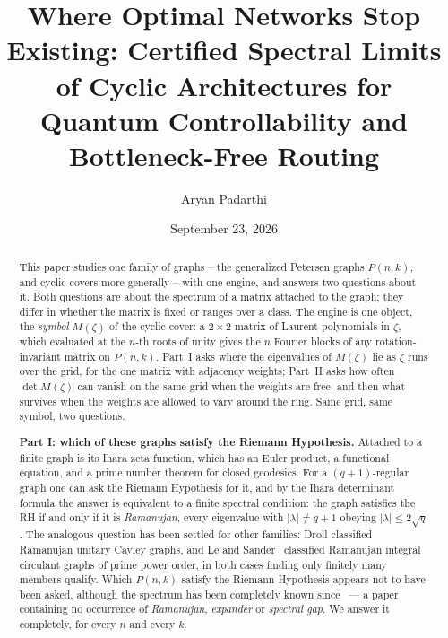 \documentclass[11pt]{article}
\title{Where Optimal Networks Stop Existing: Certified Spectral Limits\\
of Cyclic Architectures for Quantum Controllability and Bottleneck-Free Routing}
\author{Aryan Padarthi}
\date{September 23, 2026}
\theoremstyle{definition}
\begin{document}
\maketitle

\begin{abstract}
This paper studies one family of graphs -- the generalized Petersen graphs
$P(n,k)$, and cyclic covers more generally -- with one engine, and answers two
questions about it. Both questions are about the spectrum of a matrix attached
to the graph; they differ in whether the matrix is fixed or ranges over a class.
The engine is one object, the \emph{symbol} $M(\zeta)$ of the cyclic cover: a
$2\times2$ matrix of Laurent polynomials in $\zeta$, which evaluated at the
$n$-th roots of unity gives the $n$ Fourier blocks of any rotation-invariant
matrix on $P(n,k)$. Part~I asks where the eigenvalues of $M(\zeta)$ lie as
$\zeta$ runs over the grid, for the one matrix with adjacency weights; Part~II
asks how often $\det M(\zeta)$ can vanish on the same grid when the weights are
free, and then what survives when the weights are allowed to vary around the
ring. Same grid, same symbol, two questions.

\medskip\noindent\textbf{Part I: which of these graphs satisfy the Riemann
Hypothesis.}
Attached to a finite graph is its Ihara zeta function, which has an Euler
product, a functional equation, and a prime number theorem for closed geodesics.
For a $(q+1)$-regular graph one can ask the Riemann Hypothesis for it, and by
the Ihara determinant formula the answer is equivalent to a finite spectral
condition: the graph satisfies the RH if and only if it is \emph{Ramanujan},
every eigenvalue with $|\lambda|\ne q+1$ obeying $|\lambda|\le2\sqrt q$
\cite[Ex.~9]{terras}. The analogous question has been settled for other
families: Droll classified Ramanujan unitary Cayley graphs, and Le and
Sander~\cite{lesander} classified Ramanujan integral circulant graphs of prime
power order, in both cases finding only finitely many members qualify.
Which $P(n,k)$ satisfy the Riemann Hypothesis appears not to have been asked,
although the spectrum has been completely known since~\cite{gs} --- a paper
containing no occurrence of \emph{Ramanujan}, \emph{expander} or \emph{spectral
gap}. We answer it completely, for every $n$ and every $k$.


\end{abstract}
\end{document}
